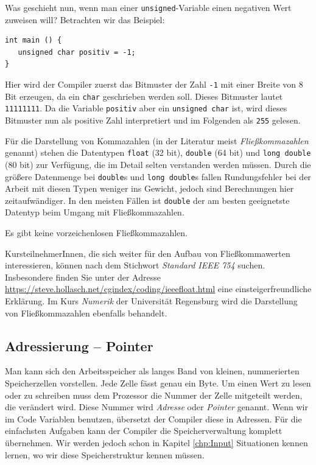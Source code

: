 Was geschieht nun, wenn man einer \texttt{unsigned}-Variable einen negativen Wert zuweisen will? Betrachten wir das Beispiel:
\begin{codebox}
\begin{verbatim}
int main () {
   unsigned char positiv = -1;
}
\end{verbatim}
\end{codebox}
Hier wird der Compiler zuerst das Bitmuster der Zahl \texttt{-1} mit einer Breite von 8 Bit erzeugen, da ein \texttt{char} geschrieben werden soll. Dieses Bitmuster lautet \texttt{11111111}. Da die Variable \texttt{positiv} aber ein \texttt{unsigned char} ist, wird dieses Bitmuster nun als positive Zahl interpretiert und im Folgenden als \texttt{255} gelesen.

Für die Darstellung von Kommazahlen (in der Literatur meist \emph{Fließkommazahlen} genannt) stehen die Datentypen \texttt{float} (32 bit), \texttt{double} (64 bit) und \texttt{long double} (80 bit) zur Verfügung, die im Detail selten verstanden werden müssen. Durch die größere Datenmenge bei \texttt{double}s und \texttt{long double}s fallen Rundungsfehler bei der Arbeit mit diesen Typen weniger ins Gewicht, jedoch sind Berechnungen hier zeitaufwändiger. In den meisten Fällen ist \texttt{double} der am besten geeignetste Datentyp beim Umgang mit Fließkommazahlen.

Es gibt keine vorzeichenlosen Fließkommazahlen.

KursteilnehmerInnen, die sich weiter für den Aufbau von Fließkommawerten interessieren, können nach dem Stichwort \emph{Standard IEEE 754} suchen. Insbesondere finden Sie unter der Adresse \url{https://steve.hollasch.net/cgindex/coding/ieeefloat.html} eine einsteigerfreundliche Erklärung. Im Kurs \emph{Numerik} der Universität Regensburg wird die Darstellung von Fließkommazahlen ebenfalls behandelt.


\subsection{Adressierung -- Pointer} \label{sec:Pointer}
Man kann sich den Arbeitsspeicher als langes Band von kleinen, nummerierten Speicherzellen vorstellen. Jede Zelle fässt genau ein Byte. Um einen Wert zu lesen oder zu schreiben muss dem Prozessor die Nummer der Zelle mitgeteilt werden, die verändert wird. Diese Nummer wird \emph{Adresse} oder \emph{Pointer} genannt. Wenn wir im Code Variablen benutzen, übersetzt der Compiler diese in Adressen. Für die einfachsten Aufgaben kann der Compiler die Speicherverwaltung komplett übernehmen. Wir werden jedoch schon in Kapitel \ref{chp:Input} Situationen kennen lernen, wo wir diese Speicherstruktur kennen müssen.

